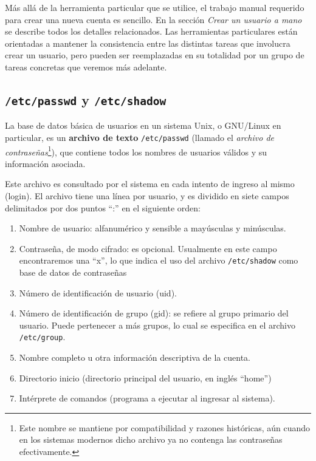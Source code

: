 \documentclass[12pt]{article}
\begin{document}
Más allá de la herramienta particular que se utilice,  
el trabajo manual requerido para crear una nueva cuenta es sencillo. En la sección
\textit{Crear un usuario a mano} se describe todos los detalles relacionados. 
Las herramientas particulares están orientadas a mantener la consistencia entre 
las distintas tareas que involucra crear un usuario, pero pueden ser reemplazadas
en su totalidad por un grupo de tareas concretas que veremos más adelante. 


\subsection*{\texttt{/etc/passwd} y \texttt{/etc/shadow}}

La base de datos básica de usuarios en un sistema Unix, o GNU/Linux en particular, 
es un \textbf{archivo de texto} \texttt{/etc/passwd} (llamado el \textit{archivo de
contraseñas}\footnote{Este nombre se mantiene por compatibilidad y razones históricas, aún cuando 
en los sistemas modernos dicho archivo ya no contenga las contraseñas efectivamente.}), 
que contiene todos los nombres de usuarios válidos y su información asociada. 

Este archivo es consultado por el sistema en cada intento de ingreso al mismo (login).
El archivo tiene una línea por usuario, y es dividido en siete campos delimitados por 
dos puntos ``:'' en el siguiente orden:

	\begin{enumerate}
	\item{Nombre de usuario: alfanumérico y sensible a mayúsculas y minúsculas.}
	\item{Contraseña, de modo cifrado: es opcional. Usualmente en este campo encontraremos 
	una ``x'', lo que indica el uso del archivo \texttt{/etc/shadow} como base de datos de 
	contraseñas}
	\item{Número de identificación de usuario (uid).} 
	\item{Número de identificación de grupo (gid): se refiere al grupo primario del usuario. Puede 
	pertenecer a más grupos, lo cual se especifica en el archivo \texttt{/etc/group}}.
	\item{Nombre completo u otra información descriptiva de la cuenta.}
	\item{Directorio inicio (directorio principal del usuario, en inglés ``home'')}
	\item{Intérprete de comandos (programa a ejecutar al ingresar al sistema).}
	\end{enumerate}
\end{document}
